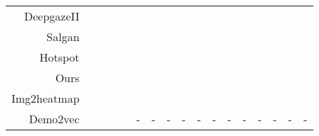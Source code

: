 \documentclass[journal,twoside]{IEEEtran}
\begin{document}
\begin{table*}[!t]
\begin{center}
\begin{tabular}{r|cccc|cccc|cccc|cccc}
   DeepgazeII \cite{DBLP:journals/corr/KummererWB16}	& \cellcolor{gray!50} & \cellcolor{gray!35} & \cellcolor{gray!20} & \cellcolor{gray!20} & \cellcolor{gray!50} & \cellcolor{gray!35} & \cellcolor{gray!35} & \cellcolor{gray!35} & \cellcolor{gray!35} & \cellcolor{gray!35} & \cellcolor{gray!20} & \cellcolor{gray!20} & \cellcolor{gray!35} & \cellcolor{gray!35} & \cellcolor{gray!20} & \cellcolor{gray!35}   \\
   Salgan \cite{Pan_2017_SalGAN}	& \cellcolor{gray!35} & \cellcolor{gray!50} & \cellcolor{gray!50} & \cellcolor{gray!50} & \cellcolor{gray!35} & \cellcolor{gray!50} & \cellcolor{gray!50} & \cellcolor{gray!70} & \cellcolor{gray!50} & \cellcolor{gray!50} & \cellcolor{gray!50} & \cellcolor{gray!50} & \cellcolor{gray!50} & \cellcolor{gray!70} & \cellcolor{gray!50} & \cellcolor{gray!50}    \\
   Hotspot \cite{interaction-hotspots} & \cellcolor{gray!70} & \cellcolor{gray!70} & \cellcolor{gray!70} & \cellcolor{gray!70} & \cellcolor{gray!70} & \cellcolor{gray!70} & \cellcolor{gray!70} & \cellcolor{gray!50} & \cellcolor{gray!70} & \cellcolor{gray!95} & \cellcolor{gray!95} & \cellcolor{gray!70} & \cellcolor{gray!70} & \cellcolor{gray!50} & \cellcolor{gray!70} & \cellcolor{gray!70}   \\
   \hline
   Ours & \cellcolor{gray!95} & \cellcolor{gray!95} & \cellcolor{gray!95} & \cellcolor{gray!95} & \cellcolor{gray!95} & \cellcolor{gray!95} & \cellcolor{gray!95} & \cellcolor{gray!95} & \cellcolor{gray!95} & \cellcolor{gray!70} & \cellcolor{gray!70}	 & \cellcolor{gray!95} & \cellcolor{gray!95} & \cellcolor{gray!95} & \cellcolor{gray!95} & \cellcolor{gray!95}    \\
   \hline
   Img2heatmap \cite{interaction-hotspots} &  &  &  &  &  &  &  &  &  &  &  &  &  &  &  &    \\

   Demo2vec\cite{demo2vec2018cvpr} &  &  &  &  & - & - & - & - & - & - & - & - & - & - & - & - \\
    \hline\bottomrule
    \end{tabular}
    \end{center}
  \end{table*}
\end{document}
